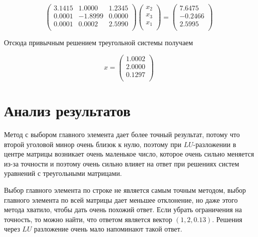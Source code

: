 \documentclass[11pt,a4paper,oneside]{article}
\begin{document}
$$ \left(\begin{matrix}
3.1415 & 1.0000 & 1.2345 \\
0.0001 & -1.8999 & 0.0000 \\
0.0001 & 0.0002 & 2.5990 \\
\end{matrix}\right)
\left(\begin{matrix}
x_2 \\
x_3 \\
x_1 \\
\end{matrix}\right)
=
\left(\begin{matrix}
7.6475 \\
-0.2466 \\
2.5995 \\
\end{matrix}\right) $$

Отсюда привычным решением треугольной системы получаем

$$ x = \left(\begin{matrix}
	1.0002 \\
	2.0000 \\
	0.1297 \\
\end{matrix}\right) $$

\section{Анализ результатов}

Метод с выбором главного элемента дает более точный результат, потому что второй уголовой минор очень близок к нулю, поэтому при $LU$-разложении в центре матрицы возникает очень маленькое число, которое очень сильно меняется из-за точности и поэтому очень сильно влияет на ответ при решениях систем уравнений с треугольными матрицами.

Выбор главного элемента по строке не является самым точным методом, выбор главного элемента по всей матрицы дает меньшее отклонение, но даже этого метода хватило, чтобы дать очень похожий ответ. Если убрать ограничения на точность, то можно найти, что ответом является вектор $(1, 2, 0.13)$. Решения через $LU$ разложение очень мало напоминают такой ответ.
\end{document}
